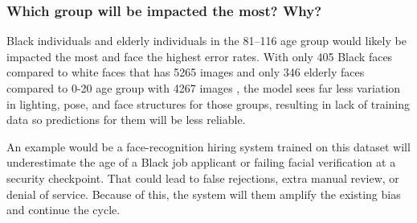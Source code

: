 \documentclass[
	letterpaper, %
]{jdf}
\begin{document}
\subsubsection{Which group will be impacted the most? Why?}
Black individuals and elderly individuals in the 81–116 age group would likely be impacted the most and face the highest error rates. With only 405 Black faces compared to white faces that has 5265 images and only 346 elderly faces compared to 0-20 age group with 4267 images , the model sees far less variation in lighting, pose, and face structures for those groups, resulting in lack of training data so predictions for them will be less reliable. 

An example would be a face-recognition hiring system trained on this dataset will underestimate the age of a Black job applicant or failing facial verification at a security checkpoint. That could lead to false rejections, extra manual review, or denial of service.
Because of this, the system will them amplify the existing bias and continue the cycle.





\printbibliography[heading=none]
\end{document}
